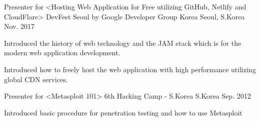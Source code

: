 \begin{cventries}
  \cventry
    {Presenter for <Hosting Web Application for Free utilizing GitHub, Netlify and CloudFlare>} %
    {DevFest Seoul by Google Developer Group Korea} %
    {Seoul, S.Korea} %
    {Nov. 2017} %
    {
      \begin{cvitems} %
        \item {Introduced the history of web technology and the JAM stack which is for the modern web application development.}
        \item {Introduced how to freely host the web application with high performance utilizing global CDN services.}
      \end{cvitems}
    }
  \cventry
    {Presenter for <Metasploit 101>} %
    {6th Hacking Camp - S.Korea} %
    {S.Korea} %
    {Sep. 2012} %
    {
      \begin{cvitems} %
        \item {Introduced basic procedure for penetration testing and how to use Metasploit}
      \end{cvitems}
    }
\end{cventries}
